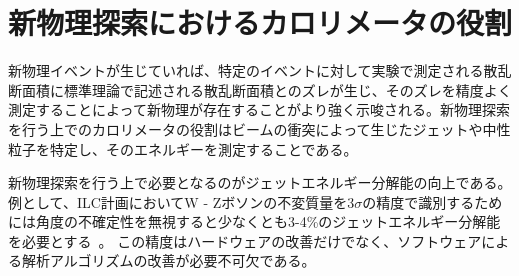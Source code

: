 


\section{新物理探索におけるカロリメータの役割}
新物理イベントが生じていれば、特定のイベントに対して実験で測定される散乱断面積に標準理論で記述される散乱断面積とのズレが生じ、そのズレを精度よく測定することによって新物理が存在することがより強く示唆される。新物理探索を行う上でのカロリメータの役割はビームの衝突によって生じたジェットや中性粒子を特定し、そのエネルギーを測定することである。

新物理探索を行う上で必要となるのがジェットエネルギー分解能の向上である。
例として、ILC計画においてW - Zボソンの不変質量を3$\sigma$の精度で識別するためには角度の不確定性を無視すると少なくとも3-4\%のジェットエネルギー分解能を必要とする~\cite{PFATest}。
この精度はハードウェアの改善だけでなく、ソフトウェアによる解析アルゴリズムの改善が必要不可欠である。

